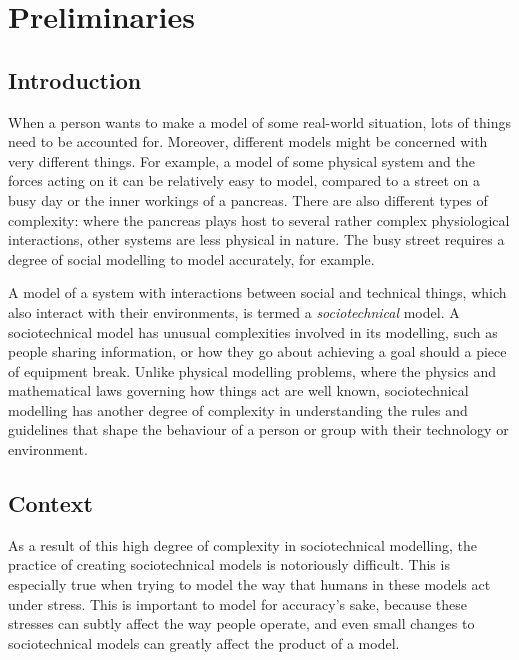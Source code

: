 \chapter{Preliminaries}
\label{intro}

\section{Introduction}
When a person wants to make a model of some real-world situation, lots of things need to be accounted for. Moreover, different models might be concerned with very different things. For example, a model of some physical system and the forces acting on it can be relatively easy to model, compared to a street on a busy day or the inner workings of a pancreas. There are also different types of complexity: where the pancreas plays host to several rather complex physiological interactions, other systems are less physical in nature. The busy street requires a degree of social modelling to model accurately, for example. \par

A model of a system with interactions between social and technical things, which also interact with their environments, is termed a \emph{sociotechnical} model. A sociotechnical model has unusual complexities involved in its modelling, such as people sharing information, or how they go about achieving a goal should a piece of equipment break. Unlike physical modelling problems, where the physics and mathematical laws governing how things act are well known, sociotechnical modelling has another degree of complexity in understanding the rules and guidelines that shape the behaviour of a person or group with their technology or environment. \par

\section{Context}
As a result of this high degree of complexity in sociotechnical modelling, the practice of creating sociotechnical models is notoriously difficult. This is especially true when trying to model the way that humans in these models act under stress. This is important to model for accuracy's sake, because these stresses can subtly affect the way people operate, and even small changes to sociotechnical models can greatly affect the product of a model\cite{Crabtree2000}. \par

